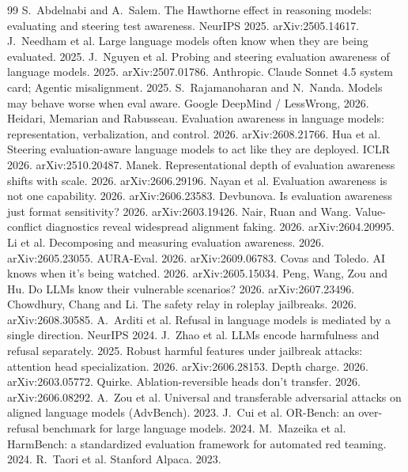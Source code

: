 \documentclass[10pt]{article}
\begin{document}
\begin{thebibliography}{99}\small
{} S.~Abdelnabi and A.~Salem. The Hawthorne effect in reasoning models: evaluating and steering test awareness. NeurIPS 2025. arXiv:2505.14617.
 J.~Needham et al. Large language models often know when they are being evaluated. 2025.
 J.~Nguyen et al. Probing and steering evaluation awareness of language models. 2025. arXiv:2507.01786.
 Anthropic. Claude Sonnet 4.5 system card; Agentic misalignment. 2025.
 S.~Rajamanoharan and N.~Nanda. Models may behave worse when eval aware. Google DeepMind / LessWrong, 2026.
 Heidari, Memarian and Rabusseau. Evaluation awareness in language models: representation, verbalization, and control. 2026. arXiv:2608.21766.
 Hua et al. Steering evaluation-aware language models to act like they are deployed. ICLR 2026. arXiv:2510.20487.
 Manek. Representational depth of evaluation awareness shifts with scale. 2026. arXiv:2606.29196.
 Nayan et al. Evaluation awareness is not one capability. 2026. arXiv:2606.23583.
 Devbunova. Is evaluation awareness just format sensitivity? 2026. arXiv:2603.19426.
 Nair, Ruan and Wang. Value-conflict diagnostics reveal widespread alignment faking. 2026. arXiv:2604.20995.
 Li et al. Decomposing and measuring evaluation awareness. 2026. arXiv:2605.23055.
 AURA-Eval. 2026. arXiv:2609.06783.
 Covas and Toledo. AI knows when it's being watched. 2026. arXiv:2605.15034.
 Peng, Wang, Zou and Hu. Do LLMs know their vulnerable scenarios? 2026. arXiv:2607.23496.
 Chowdhury, Chang and Li. The safety relay in roleplay jailbreaks. 2026. arXiv:2608.30585.
 A.~Arditi et al. Refusal in language models is mediated by a single direction. NeurIPS 2024.
 J.~Zhao et al. LLMs encode harmfulness and refusal separately. 2025.
 Robust harmful features under jailbreak attacks: attention head specialization. 2026. arXiv:2606.28153.
 Depth charge. 2026. arXiv:2603.05772.
 Quirke. Ablation-reversible heads don't transfer. 2026. arXiv:2606.08292.
 A.~Zou et al. Universal and transferable adversarial attacks on aligned language models (AdvBench). 2023.
 J.~Cui et al. OR-Bench: an over-refusal benchmark for large language models. 2024.
 M.~Mazeika et al. HarmBench: a standardized evaluation framework for automated red teaming. 2024.
 R.~Taori et al. Stanford Alpaca. 2023.
\end{thebibliography}
\end{document}
